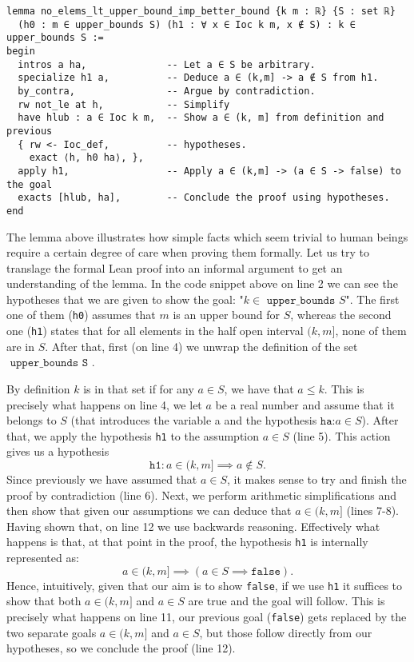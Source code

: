 \documentclass[11pt]{article}
\begin{document}
\begin{verbatim}
lemma no_elems_lt_upper_bound_imp_better_bound {k m : ℝ} {S : set ℝ}
  (h0 : m ∈ upper_bounds S) (h1 : ∀ x ∈ Ioc k m, x ∉ S) : k ∈ upper_bounds S :=
begin
  intros a ha,              -- Let a ∈ S be arbitrary.
  specialize h1 a,          -- Deduce a ∈ (k,m] -> a ∉ S from h1.
  by_contra,                -- Argue by contradiction.
  rw not_le at h,           -- Simplify
  have hlub : a ∈ Ioc k m,  -- Show a ∈ (k, m] from definition and previous
  { rw <- Ioc_def,          -- hypotheses.
    exact ⟨h, h0 ha⟩, },
  apply h1,                 -- Apply a ∈ (k,m] -> (a ∈ S -> false) to the goal
  exacts [hlub, ha],        -- Conclude the proof using hypotheses.
end
\end{verbatim}
The lemma above illustrates how simple facts which seem trivial to human beings
require a certain degree of care when proving them formally. Let us try to
translage the formal Lean proof into an informal argument to get an
understanding of the lemma. In the code snippet above on line 2 we can see the
hypotheses that we are given to show the goal: "$k \in \texttt{ upper\_bounds }
S$". The first one of them (\texttt{h0}) assumes that  $m$ is an upper bound
for  $S$, whereas the second one (\texttt{h1}) states that for all elements in
the half open interval $(k, m]$, none of them are in  $S$. After that, first
(on line 4) we unwrap the definition of the set $\texttt{ upper\_bounds S }$.

By definition $k$ is in that set if for any $a \in S$, we have that  $a \le k$.
This is precisely what happens on line 4, we let  $a$ be a real number and
assume that it belongs to  $S$ (that introduces the variable a and the
hypothesis  $\texttt{ha:} a \in S$). After that, we apply the hypothesis
\texttt{h1} to the assumption $a \in S$ (line 5). This action gives us a
hypothesis
$$\texttt{h1} : a \in (k,m] \implies a \not\in S.$$
Since previously
we have assumed that $a \in S$, it makes sense to try and finish the proof by
contradiction (line 6). Next, we perform arithmetic
simplifications and then show that given our assumptions we can
deduce that $ a \in (k, m]$ (lines 7-8). Having shown that, on line 12 we use
backwards reasoning. Effectively what happens is that, at that point in the
proof, the hypothesis \texttt{h1} is internally represented as:
$$ a \in (k,m] \implies (a \in S \implies \texttt{false}) .$$
Hence, intuitively, given that
our aim is to show \texttt{false}, if we use \texttt{h1} it suffices to show
that both $ a \in (k,m] $ and $a \in S$ are true and the goal will follow. This
is precisely what happens on line 11, our previous goal (\texttt{false}) gets
replaced by the two separate goals $ a \in (k,m] $ and $a \in S$, but those
follow directly from our hypotheses, so we conclude the proof (line 12).
\end{document}
